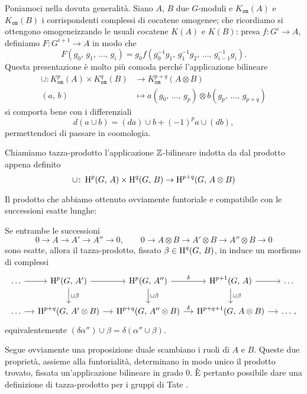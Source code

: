 Poniamoci nella dovuta generalità. Siano $ A, \, B $ due $ G $-moduli e $ K_{\mathtt{om}}(A) $ e $ K_{\mathtt{om}}(B) $ i corrispondenti complessi di cocatene omogenee; che ricordiamo si ottengono omogeneizzando le usuali cocatene $ K(A) $ e $ K(B) $: presa $ f \colon G^i \to A $, definiamo $ F\colon G^{i+1} \to A  $ in modo che
\[ F(g_0, \, g_1, \, \dots, \, g_i) = g_0 f(g_0^{-1}g_1, \, g_1^{-1}g_2, \, \dots, \, g_{i-1}^{-1}g_i). \]
Questa presentazione è molto più comoda perché l'applicazione bilineare
\begin{align*}
	\cup \colon K^p_{\mathtt{om}}(A) \times K^q_{\mathtt{om}}(B) &\to K_{\mathtt{om}}^{p+q}(A \otimes B)\\
	(a, \, b) & \mapsto a(g_0,\, \dots, \, g_p) \otimes b(g_p,\, \dots, \, g_{p+q})
\end{align*}
si comporta bene con i differenziali
\[ d(a \cup b) = (da) \cup b + (-1)^p a \cup (db), \]
permettendoci di passare in coomologia.

\begin{definition}
	Chiamiamo tazza-prodotto l'applicazione $ \mathbb{Z} $-bilineare indotta da dal prodotto appena definito
	\[ \cup \colon \operatorname{H}^p(G, \, A) \times \operatorname{H}^q(G, \, B) \to \operatorname{H}^{p+q}(G, \, A \otimes B)  \]
\end{definition}

Il prodotto che abbiamo ottenuto ovviamente funtoriale e compatibile con le successioni esatte lunghe:

\begin{proposition}\label{cup1}
	Se entrambe le successioni
	\[ 0 \to A \to A' \to A'' \to 0, \qquad 0 \to A \otimes B \to A'\otimes B \to A''\otimes B \to 0 \]
	sono esatte, allora il tazza-prodotto, fissato $ \beta \in \operatorname{H}^q(G, \, B) $, in induce un morfismo di complessi
	\[\begin{tikzcd}[column sep = small]
	\dots \rar
	& \HH^{p}(G, \, A') \dar["\cup\beta"] \rar 
	& \HH^{p}(G, \, A'') \rar["\delta"] \dar["\cup\beta"]
	& \HH^{p+1}(G, \, A) \rar \dar["\cup\beta"]
	&\dots  \\
	\dots \rar
	& \HH^{p+q}(G, \, A'\otimes B) \rar
	& \HH^{p+q}(G, \, A''\otimes B) \rar["\delta"]
	& \HH^{p+q+1}(G, \, A\otimes B) \rar &\dots \, , \end{tikzcd}\]
	equivalentemente $ (\delta\alpha'') \cup \beta = \delta (\alpha'' \cup \beta) $.
\end{proposition}

Segue ovviamente una proposizione duale scambiano i ruoli di $ A $ e $ B $. Queste due proprietà, assieme alla funtorialità, determinano in modo unico il prodotto trovato, fissata un'applicazione bilineare in grado 0. È pertanto possibile dare una definizione di tazza-prodotto per i gruppi di Tate \cite[proposizione 1.4.7]{Schmidt}. \\


